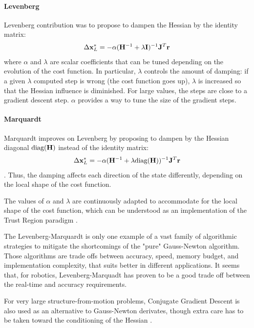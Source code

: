 \paragraph{Levenberg}
Levenberg \cite{levenberg1944method} contribution was to propose to dampen the Hessian by the identity matrix:
%
\begin{equation}
    \Delta {\bf x}_{L}^* = - \alpha ({\bf H}^{-1} + \lambda {\bf I})^{-1} {\bf J}^T {\bf r}
\end{equation}
%
where $\alpha$ and $\lambda$ are scalar coefficients that can be tuned depending on the evolution of the cost function. 
In particular, $\lambda$ controls the amount of damping: if a given $\lambda$ computed step is wrong (the cost function goes up),
$\lambda$ is increased so that the Hessian influence is diminished. For large values, the steps are close to a gradient descent step.
$\alpha$ provides a way to tune the size of the gradient steps.



\paragraph{Marquardt}
Marquardt \cite{marquardt1963algorithm} improves on Levenberg by proposing to dampen by the Hessian diagonal $\text{diag}({\bf H})$
instead of the identity matrix:
%
\begin{equation}
    \Delta {\bf x}_{L}^* = - \alpha ({\bf H}^{-1} + \lambda \text{diag}({\bf H}))^{-1} {\bf J}^T {\bf r}
\end{equation}.
Thus, the damping affects each direction of the state differently, depending on the local shape of the cost function.

The values of $\alpha$ and $\lambda$ are continuously adapted to accommodate for the local shape of the cost function, which can be understood as an implementation of the 
Trust Region paradigm \cite{boyd2004convex}. 

The Levenberg-Marquardt is only one example of a vast family of algorithmic strategies 
to mitigate the shortcomings of the "pure" Gauss-Newton algorithm. Those algorithms are trade offs between accuracy, speed, memory budget, and implementation complexity, 
that suits better in different applications. It seems that, for robotics, Levenberg-Marquadt has proven to be a good trade off between the real-time and
accuracy requirements. 

For very large structure-from-motion problems, Conjugate Gradient Descent is also used as an alternative to Gauss-Newton derivates, though extra care has to 
be taken toward the conditioning of the Hessian \cite{jian2012generalized}.



